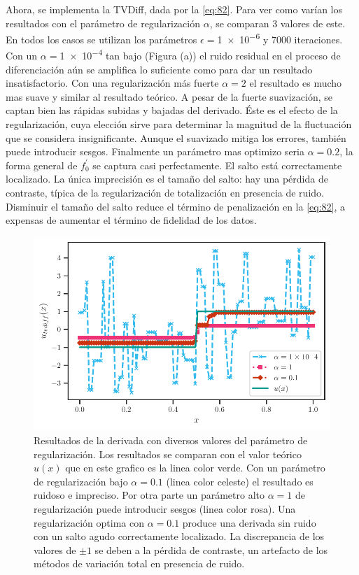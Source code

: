 Ahora, se implementa la TVDiff, dada por la \cref{eq:82}. Para ver como varían los resultados con el parámetro de regularización $\alpha$, se comparan 3 valores de este. En todos los casos se utilizan los parámetros $\epsilon=$\num{1e-6} y 7000 iteraciones.  Con un   $\alpha=$\num{1e-4}  tan bajo (Figura (a)) el ruido residual en el proceso de diferenciación aún se amplifica lo suficiente como para dar un resultado insatisfactorio. Con una regularización más fuerte $\alpha=2$ el resultado es mucho mas suave y similar al resultado teórico.  A pesar de la fuerte suavización, se captan bien las rápidas subidas y bajadas del derivado. Éste es el efecto de la regularización, cuya elección sirve para determinar la magnitud de la fluctuación que se considera insignificante. Aunque el suavizado mitiga los errores, también puede introducir sesgos.  Finalmente un parámetro mas optimizo seria $\alpha=0.2$, la forma general de $f^\prime_0$ se captura casi perfectamente. El salto está correctamente localizado. La única imprecisión es el tamaño del salto: hay una pérdida de contraste, típica de la regularización de totalización en presencia de ruido. Disminuir el tamaño del salto reduce el término de penalización en la \cref{eq:82}, a expensas de aumentar el término de fidelidad de los datos.


\begin{figure}[h!]
	\centering{}\includegraphics[width=\imsize]{derivada_regularizadas.pdf}
	\caption[Resultados de la derivada con diversos valores del parámetro de regularización. ]{Resultados de la derivada con diversos valores del parámetro de regularización. Los resultados se comparan con el valor teórico $u(x)$ que en este grafico es la linea color verde. Con un parámetro de regularización bajo $\alpha=0.1$ (linea color celeste) el resultado es ruidoso e impreciso.  Por otra parte un parámetro alto $\alpha=1$ de regularización puede introducir sesgos (linea color rosa). Una regularización optima  con $\alpha=0.1$  produce una derivada sin ruido con un salto agudo correctamente localizado. La discrepancia de los valores de  $\pm 1$  se deben a la pérdida de contraste, un artefacto de los métodos de variación total en presencia de ruido.}\label{f:derivada_regularizada}  
\end{figure}


